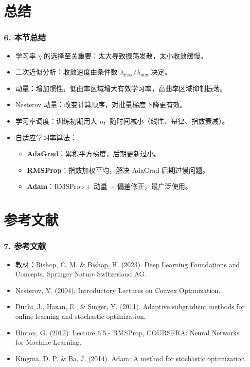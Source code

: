 \documentclass[t,aspectratio=169]{beamer} %
\begin{document}
\section{总结}

\begin{frame}
    \frametitle{6. 本节总结}
    \begin{itemize}
        \item \alert{学习率 $\eta$} 的选择至关重要：太大导致振荡发散，太小收敛缓慢。
        \item \alert{二次近似分析}：收敛速度由条件数 $\lambda_{\max}/\lambda_{\min}$ 决定。
        \item \alert{动量}：增加惯性，低曲率区域增大有效学习率，高曲率区域抑制振荡。
        \item \alert{Nesterov 动量}：改变计算顺序，对批量梯度下降更有效。
        \item \alert{学习率调度}：训练初期用大 $\eta$，随时间减小（线性、幂律、指数衰减）。
        \item \alert{自适应学习率算法}：
        \begin{itemize}
            \item \textbf{AdaGrad}：累积平方梯度，后期更新过小。
            \item \textbf{RMSProp}：指数加权平均，解决 AdaGrad 后期过慢问题。
            \item \textbf{Adam}：RMSProp + 动量 + 偏差修正，最广泛使用。
        \end{itemize}
    \end{itemize}
\end{frame}

\section{参考文献}

\begin{frame}
    \frametitle{7. 参考文献}
    \begin{itemize}
        \item 教材：Bishop, C. M. \& Bishop, H. (2023). Deep Learning Foundations and Concepts. Springer Nature Switzerland AG.
        \item Nesterov, Y. (2004). Introductory Lectures on Convex Optimization.
        \item Duchi, J., Hazan, E., \& Singer, Y. (2011). Adaptive subgradient methods for online learning and stochastic optimization.
        \item Hinton, G. (2012). Lecture 6.5 - RMSProp, COURSERA: Neural Networks for Machine Learning.
        \item Kingma, D. P. \& Ba, J. (2014). Adam: A method for stochastic optimization.
    \end{itemize}
\end{frame}
\end{document}
